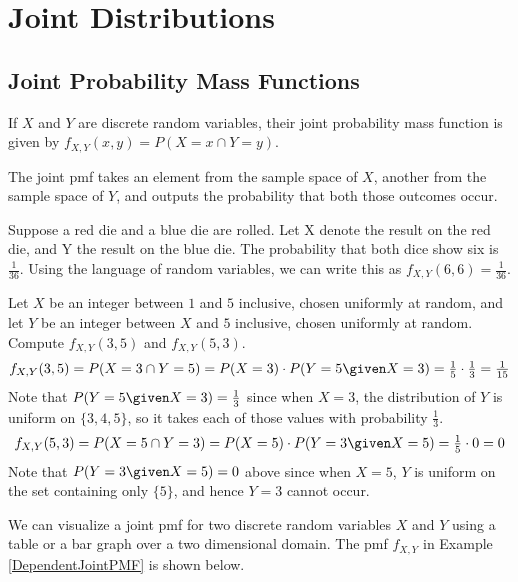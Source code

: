 \pagestyle{headings}
\chapter{Joint Distributions} \label{chp 5}
\thispagestyle{fancy}
\section{Joint Probability Mass Functions}

\begin{defn}\label{JointPMF}
If $X$ and $Y$ are discrete random variables, their joint probability mass function is given by $f_{X,Y}(x,y) = P(X = x  \cap Y = y)$.
\end{defn}
\par
The joint pmf takes an element from the sample space of $X$, another from the sample space of $Y$, and outputs the probability that both those outcomes occur.
\begin{examp}
Suppose a red die and a blue die are rolled. Let X denote the result on the red die, and Y the result on the blue die. The probability that both dice show six is $\frac{1}{36}$. Using the language of random variables, we can write this as $f_{X,Y}(6,6) = \frac{1}{36}$.
\end{examp}
\begin{examp}\label{DependentJointPMF}
Let $X$ be an integer between $1$ and $5$ inclusive, chosen uniformly at random, and let $Y$ be an integer between $X$ and $5$ inclusive, chosen uniformly at random. Compute $f_{X,Y}(3,5)$ and $f_{X,Y}(5,3)$.
$$f_{X,Y}(3,5) = P(X = 3 \cap  Y = 5) = P(X = 3)\cdot P(Y = 5 \given X = 3) = \textstyle\frac{1}{5}\cdot\frac{1}{3} = \frac{1}{15}$$
\noindent Note that $P(Y = 5 \given X = 3) = \frac{1}{3}$ since when $X = 3$, the distribution of $Y$ is uniform on $\{3,4,5\}$, so it takes each of those values with probability $\frac{1}{3}$.
$$f_{X,Y}(5,3) = P(X = 5 \cap  Y = 3) = P(X = 5)\cdot P(Y = 3 \given X = 5) = \textstyle\frac{1}{5}\cdot 0 = 0$$
Note that $P(Y = 3 \given X = 5) = 0$ above since when $X = 5$, $Y$ is uniform on the set containing only $\{5\}$, and hence $Y=3$ cannot occur.
\end{examp}
\par
We can visualize a joint pmf for two discrete random variables $X$ and $Y$ using a table or a bar graph over a two dimensional domain. The pmf $f_{X,Y}$ in Example \ref{DependentJointPMF} is shown below.

